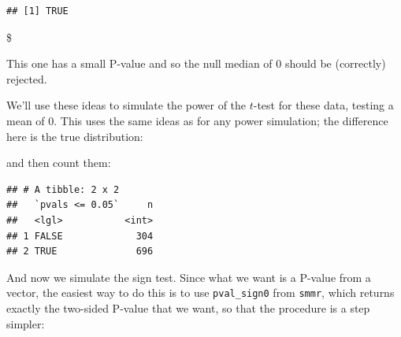 \documentclass[]{tufte-book}
\newenvironment{Shaded}{}{}
\newcommand{\DataTypeTok}[1]{\textcolor[rgb]{0.56,0.13,0.00}{#1}}
\newcommand{\DecValTok}[1]{\textcolor[rgb]{0.25,0.63,0.44}{#1}}
\newcommand{\FloatTok}[1]{\textcolor[rgb]{0.25,0.63,0.44}{#1}}
\newcommand{\KeywordTok}[1]{\textcolor[rgb]{0.00,0.44,0.13}{\textbf{#1}}}
\newcommand{\NormalTok}[1]{#1}
\newcommand{\OperatorTok}[1]{\textcolor[rgb]{0.40,0.40,0.40}{#1}}
\newcommand{\StringTok}[1]{\textcolor[rgb]{0.25,0.44,0.63}{#1}}
\theoremstyle{definition}
\theoremstyle{definition}
\theoremstyle{definition}
\theoremstyle{remark}
\begin{document}
\begin{verbatim}
## [1] TRUE
\end{verbatim}

\$

This one has a small P-value and so the null median of 0 should be
(correctly) rejected.

We'll use these ideas to simulate the power of the \(t\)-test for these
data, testing a mean of 0. This uses the same ideas as for any power
simulation; the difference here is the true distribution:

\begin{Shaded}
\end{Shaded}

and then count them:

\begin{Shaded}
\end{Shaded}

\begin{verbatim}
## # A tibble: 2 x 2
##   `pvals <= 0.05`     n
##   <lgl>           <int>
## 1 FALSE             304
## 2 TRUE              696
\end{verbatim}

And now we simulate the sign test. Since what we want is a P-value from
a vector, the easiest way to do this is to use \texttt{pval\_sign0} from
\texttt{smmr}, which returns exactly the two-sided P-value that we want,
so that the procedure is a step simpler:

\begin{Shaded}
\end{Shaded}
\end{document}
